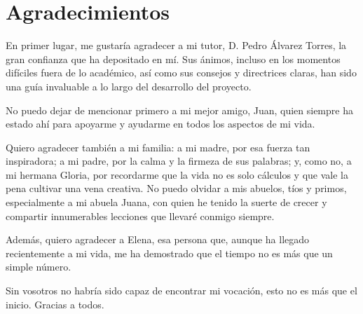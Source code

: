 \documentclass[12pt,a4paper]{report}
\begin{document}

\thispagestyle{empty}
\mbox{}
\newpage


\tableofcontents	

\clearpage
\mbox{}
\thispagestyle{empty}
\newpage

\renewcommand{\listtablename}{Índice de tablas}
\listoffigures

\clearpage
\mbox{}
\thispagestyle{empty}
\newpage

\listoftables

\clearpage
\mbox{}
\thispagestyle{empty}
\newpage

\chapter*{Agradecimientos} 

En primer lugar, me gustaría agradecer a mi tutor, D. Pedro Álvarez Torres, la gran confianza que ha depositado en mí. Sus ánimos, incluso en los momentos difíciles fuera de lo académico, así como sus consejos y directrices claras, han sido una guía invaluable a lo largo del desarrollo del proyecto.

No puedo dejar de mencionar primero a mi mejor amigo, Juan, quien siempre ha estado ahí para apoyarme y ayudarme en todos los aspectos de mi vida. 

Quiero agradecer también a mi familia: a mi madre, por esa fuerza tan inspiradora; a mi padre, por la calma y la firmeza de sus palabras; y, como no, a mi hermana Gloria, por recordarme que la vida no es solo cálculos y que vale la pena cultivar una vena creativa. No puedo olvidar a mis abuelos, tíos y primos, especialmente a mi abuela Juana, con quien he tenido la suerte de crecer y compartir innumerables lecciones que llevaré conmigo siempre. 

Además, quiero agradecer a Elena, esa persona que, aunque ha llegado recientemente a mi vida, me ha demostrado que el tiempo no es más que un simple número. 

Sin vosotros no habría sido capaz de encontrar mi vocación, esto no es más que el inicio. Gracias a todos.

\clearpage
\mbox{}
\thispagestyle{empty}
\newpage
\end{document}
